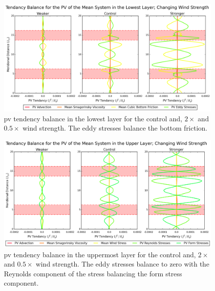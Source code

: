 \documentclass[12pt,a4paper]{report}
\begin{document}
  \begin{figure}
  	\centering
  	\includegraphics[width=\linewidth]{pvbalance_0_1}
  	\caption{\gls{pv} tendency balance in the lowest layer for
  		the control and, $2\times$ and  $0.5\times$ wind strength.
  		The eddy stresses balance the bottom friction. }
  	\label{pvbalance01}
  \end{figure}
  
  \begin{figure}
  	\centering
  	\includegraphics[width=\linewidth]{pvbalance_0_3}
  	\caption{\gls{pv} tendency balance in the uppermost layer for
  		the control and, $2\times$ and  $0.5\times$ wind strength.
  		The eddy stresses balance to zero with the Reynolds component of the stress
  		balancing the form stress component.  }
  	\label{pvbalance03}
  \end{figure}
  
\end{document}
